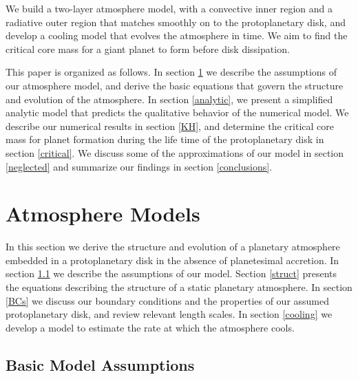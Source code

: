 \documentclass[apj]{emulateapj}
\begin{document}
We build a two-layer atmosphere model, with a convective inner region and a radiative outer region that matches smoothly on to the protoplanetary disk, and develop a cooling model that evolves the atmosphere in time. We aim to find the critical core mass for a giant planet to form before disk dissipation.

This paper is organized as follows. In section \ref{sec2} we describe the assumptions of our atmosphere model, and derive the basic equations that govern the structure and evolution of the atmosphere. In section \ref{analytic}, we present a simplified analytic model that predicts the qualitative behavior of the numerical model. We describe our numerical results in section \ref{KH}, and determine the critical core mass for planet formation during the life time of the protoplanetary disk in section \ref{critical}.  We discuss some of the approximations of our model in section \ref{neglected} and summarize our findings in section \ref{conclusions}.





\section{Atmosphere Models}
\label{sec2}

In this section we derive the structure and evolution of a planetary atmosphere embedded in a protoplanetary disk in the absence of planetesimal accretion. In section \ref{model} we describe the assumptions of our model. Section \ref{struct} presents the equations describing the structure of a static planetary atmosphere.  In section \ref{BCs} we discuss our boundary conditions and the properties of our assumed protoplanetary disk, and review relevant length scales.  In section \ref{cooling} we develop a model to estimate the rate at which the atmosphere cools. %

\subsection{Basic Model Assumptions}
\label{model}
\end{document}
